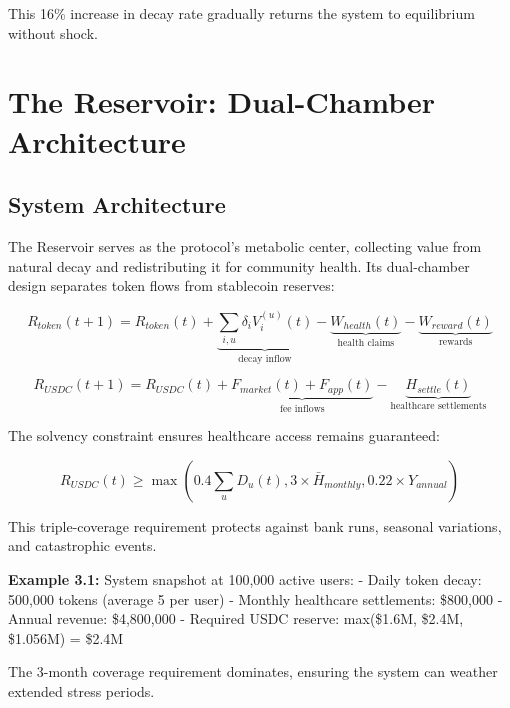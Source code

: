 \documentclass[11pt,letterpaper]{article}
\begin{document}
This 16\% increase in decay rate gradually returns the system to equilibrium without shock.

\section{The Reservoir: Dual-Chamber Architecture}

\subsection{System Architecture}

The Reservoir serves as the protocol's metabolic center, collecting value from natural decay and redistributing it for community health. Its dual-chamber design separates token flows from stablecoin reserves:

\begin{equation}
R_{token}(t+1) = R_{token}(t) + \underbrace{\sum_{i,u} \delta_i V_i^{(u)}(t)}_{\text{decay inflow}} - \underbrace{W_{health}(t)}_{\text{health claims}} - \underbrace{W_{reward}(t)}_{\text{rewards}}
\end{equation}

\begin{equation}
R_{USDC}(t+1) = R_{USDC}(t) + \underbrace{F_{market}(t) + F_{app}(t)}_{\text{fee inflows}} - \underbrace{H_{settle}(t)}_{\text{healthcare settlements}}
\end{equation}

The solvency constraint ensures healthcare access remains guaranteed:

\begin{equation}
R_{USDC}(t) \geq \max\left(0.4 \sum_u D_u(t), 3 \times \bar{H}_{monthly}, 0.22 \times Y_{annual}\right)
\end{equation}

This triple-coverage requirement protects against bank runs, seasonal variations, and catastrophic events.

\textbf{Example 3.1:} System snapshot at 100,000 active users:
- Daily token decay: 500,000 tokens (average 5 per user)
- Monthly healthcare settlements: \$800,000
- Annual revenue: \$4,800,000
- Required USDC reserve: max(\$1.6M, \$2.4M, \$1.056M) = \$2.4M

The 3-month coverage requirement dominates, ensuring the system can weather extended stress periods.
\end{document}
